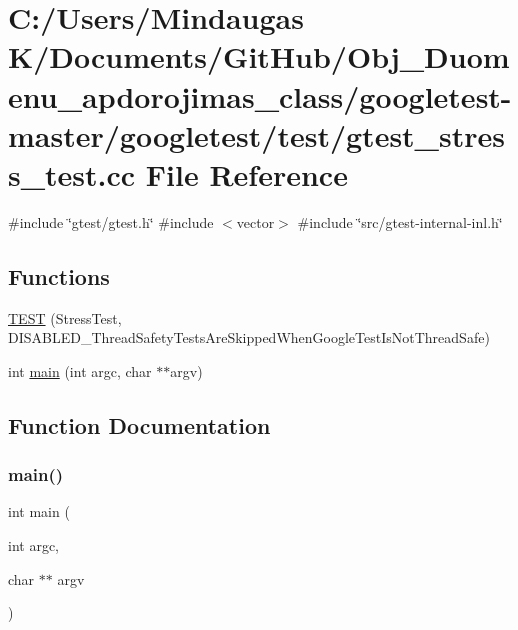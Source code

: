 \hypertarget{googletest-master_2googletest_2test_2gtest__stress__test_8cc}{}\section{C\+:/\+Users/\+Mindaugas K/\+Documents/\+Git\+Hub/\+Obj\+\_\+\+Duomenu\+\_\+apdorojimas\+\_\+class/googletest-\/master/googletest/test/gtest\+\_\+stress\+\_\+test.cc File Reference}
\label{googletest-master_2googletest_2test_2gtest__stress__test_8cc}
{\ttfamily \#include \char`\"{}gtest/gtest.\+h\char`\"{}}\newline
{\ttfamily \#include $<$vector$>$}\newline
{\ttfamily \#include \char`\"{}src/gtest-\/internal-\/inl.\+h\char`\"{}}\newline
\subsection*{Functions}
\begin{DoxyCompactItemize}
\item 
\mbox{\hyperlink{googletest-master_2googletest_2test_2gtest__stress__test_8cc_ab463b16d4ea21758ce541b0f81e5c5d6}{T\+E\+ST}} (Stress\+Test, D\+I\+S\+A\+B\+L\+E\+D\+\_\+\+Thread\+Safety\+Tests\+Are\+Skipped\+When\+Google\+Test\+Is\+Not\+Thread\+Safe)
\item 
int \mbox{\hyperlink{googletest-master_2googletest_2test_2gtest__stress__test_8cc_a3c04138a5bfe5d72780bb7e82a18e627}{main}} (int argc, char $\ast$$\ast$argv)
\end{DoxyCompactItemize}


\subsection{Function Documentation}
\mbox{\label{googletest-master_2googletest_2test_2gtest__stress__test_8cc_a3c04138a5bfe5d72780bb7e82a18e627}} 
\subsubsection{\texorpdfstring{main()}{main()}}
{\footnotesize\ttfamily int main (\begin{DoxyParamCaption}\item[{int}]{argc,  }\item[{char $\ast$$\ast$}]{argv }\end{DoxyParamCaption})}

